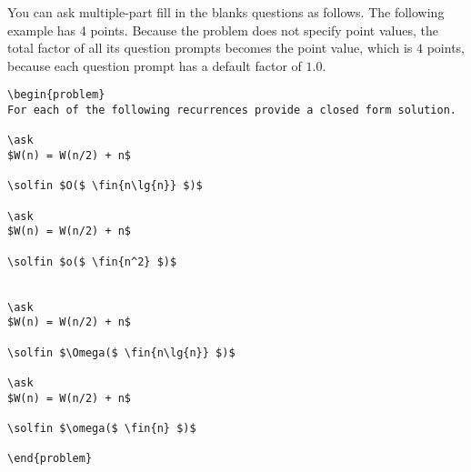 \begin{cluster}
\label{grp:xmpl:quiz::multi-part-fill-in-the-blanks-questions}

\begin{example}
\label{xmpl:quiz::multi-part-fill-in-the-blanks-questions}
You can ask multiple-part fill in the blanks questions as follows.
The following example has 4 points.  Because the problem does not specify point values, the total factor of all its question prompts becomes the point value, which is $4$ points, because each question prompt has a default factor of $1.0$.

\begin{lstlisting}
\begin{problem}
For each of the following recurrences provide a closed form solution.

\ask 
$W(n) = W(n/2) + n$

\solfin $O($ \fin{n\lg{n}} $)$

\ask 
$W(n) = W(n/2) + n$

\solfin $o($ \fin{n^2} $)$


\ask 
$W(n) = W(n/2) + n$

\solfin $\Omega($ \fin{n\lg{n}} $)$

\ask 
$W(n) = W(n/2) + n$

\solfin $\omega($ \fin{n} $)$

\end{problem}
\end{lstlisting}

\end{example}
\end{cluster}

